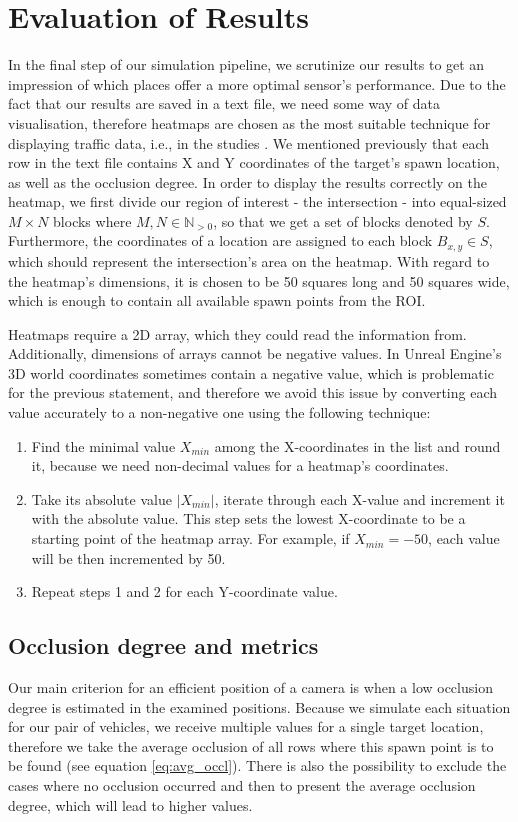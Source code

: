  \section{Evaluation of Results}
 In the final step of our simulation pipeline, we scrutinize our results to get an impression of which places offer a more optimal sensor's performance. Due to the fact that our results are saved in a text file, we need some way of data visualisation, therefore heatmaps are chosen as the most suitable technique for displaying traffic data, i.e., in the studies \cite{heatmap_first, heatmap_second}. We mentioned previously that each row in the text file contains X and Y coordinates of the target's spawn location, as well as the occlusion degree. In order to display the results correctly on the heatmap, we first divide our region of interest - the intersection - into equal-sized $M \times N$ blocks where $M,N \in \mathbb{N}_{>0}$, so that we get a set of blocks denoted by $S$. Furthermore, the coordinates of a location are assigned to each block $B_{x,y} \in S$, which should represent the intersection's area on the heatmap. With regard to the heatmap's dimensions, it is chosen to be 50 squares long and 50 squares wide, which is enough to contain all available spawn points from the ROI. 
 
 Heatmaps require a 2D array, which they could read the information from. Additionally, dimensions of arrays cannot be negative values. In Unreal Engine's 3D world coordinates sometimes contain a negative value, which is problematic for the previous statement, and therefore we avoid this issue by converting each value accurately to a non-negative one using the following technique:
 \begin{enumerate}
     \item Find the minimal value $X_{min}$ among the X-coordinates in the list and round it, because we need non-decimal values for a heatmap's coordinates.
     \item Take its absolute value $|X_{min}|$, iterate through each X-value and increment it with the absolute value. This step sets the lowest X-coordinate to be a starting point of the heatmap array. For example, if $X_{min} = -50$, each value will be then incremented by 50.  
     \item Repeat steps 1 and 2 for each Y-coordinate value.
 \end{enumerate}
 
\subsection{Occlusion degree and metrics}
Our main criterion for an efficient position of a camera is when a low occlusion degree is estimated in the examined positions. Because we simulate each situation for our pair of vehicles, we receive multiple values for a single target location, therefore we take the average occlusion of all rows where this spawn point is to be found (see equation \ref{eq:avg_occl}). There is also the possibility to exclude the cases where no occlusion occurred and then to present the average occlusion degree, which will lead to higher values. 

